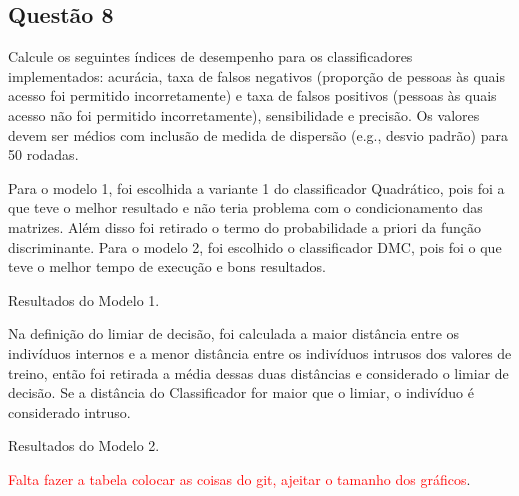 \documentclass[a4paper,12pt]{article}
\newcommand{\nonumsubsection}[1]{%
  \subsection*{#1}%
  \addcontentsline{toc}{subsection}{#1}%
}
\begin{document}
\nonumsubsection{Questão 8}
\begin{tcolorbox}[colback=blue!5!white, colframe=blue!75!black]
    Calcule os seguintes índices de desempenho para os classificadores implementados:
     acurácia, taxa de falsos negativos (proporção de pessoas às quais acesso foi permitido incorretamente)
      e taxa de falsos positivos (pessoas às quais acesso não foi permitido incorretamente), sensibilidade e precisão. Os valores devem ser médios com inclusão de medida de dispersão (e.g., desvio padrão) para 50 rodadas.
\end{tcolorbox}
Para o modelo 1, foi escolhida a variante 1 do classificador Quadrático,
 pois foi a que teve o melhor resultado e não teria problema com o condicionamento das matrizes. Além disso foi retirado o termo do probabilidade a priori da função discriminante.
Para o modelo 2, foi escolhido o classificador DMC, pois foi o que teve o melhor tempo de execução e bons resultados.
\begin{table}[H]
\centering

\caption{Resultados do Modelo 1.}
\end{table}
Na definição do limiar de decisão, foi calculada a maior distância entre os indivíduos internos e a menor distância entre os indivíduos intrusos dos valores de treino,
então foi retirada a média dessas duas distâncias e considerado o limiar de decisão. Se a distância do Classificador for maior que o limiar, o indivíduo é considerado intruso.

\begin{table}[H]
\centering

\caption{Resultados do Modelo 2.}
\end{table}

\textcolor{red}{Falta fazer a tabela colocar as coisas do git, ajeitar o tamanho dos gráficos}.
\end{document}
